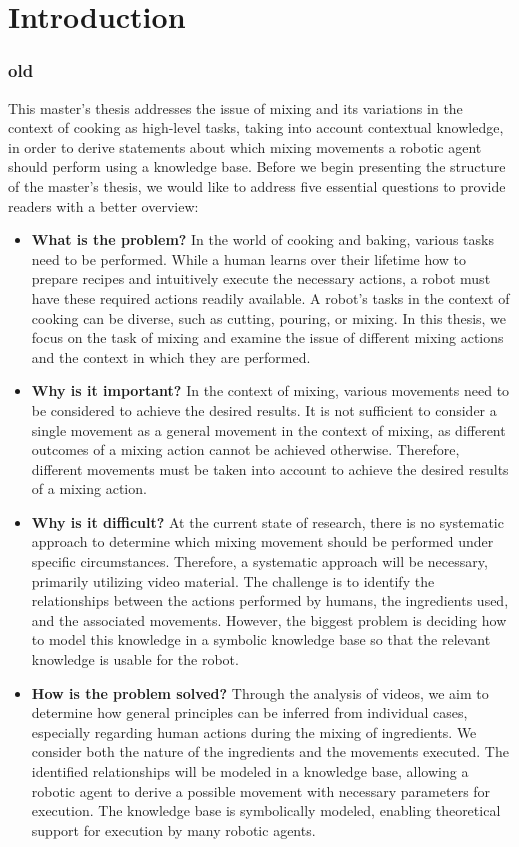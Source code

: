 \chapter{Introduction}
\subsection{old}
This master's thesis addresses the issue of mixing and its variations in the context of cooking as high-level tasks, taking into account contextual knowledge, in order to derive statements about which mixing movements a robotic agent should perform using a knowledge base.
Before we begin presenting the structure of the master's thesis, we would like to address five essential questions to provide readers with a better overview:
\begin{itemize}
    \item \textbf{What is the problem?} In the world of cooking and baking, various tasks need to be performed. While a human learns over their lifetime how to prepare recipes and intuitively execute the necessary actions, a robot must have these required actions readily available. A robot's tasks in the context of cooking can be diverse, such as cutting, pouring, or mixing. In this thesis, we focus on the task of mixing and examine the issue of different mixing actions and the context in which they are performed.    
    \item \textbf{Why is it important?} In the context of mixing, various movements need to be considered to achieve the desired results. It is not sufficient to consider a single movement as a general movement in the context of mixing, as different outcomes of a mixing action cannot be achieved otherwise. Therefore, different movements must be taken into account to achieve the desired results of a mixing action.
    \item \textbf{Why is it difficult?} At the current state of research, there is no systematic approach to determine which mixing movement should be performed under specific circumstances. Therefore, a systematic approach will be necessary, primarily utilizing video material. The challenge is to identify the relationships between the actions performed by humans, the ingredients used, and the associated movements. However, the biggest problem is deciding how to model this knowledge in a symbolic knowledge base so that the relevant knowledge is usable for the robot.
    \item \textbf{How is the problem solved?} Through the analysis of videos, we aim to determine how general principles can be inferred from individual cases, especially regarding human actions during the mixing of ingredients. We consider both the nature of the ingredients and the movements executed. The identified relationships will be modeled in a knowledge base, allowing a robotic agent to derive a possible movement with necessary parameters for execution. The knowledge base is symbolically modeled, enabling theoretical support for execution by many robotic agents.

\end{itemize}

